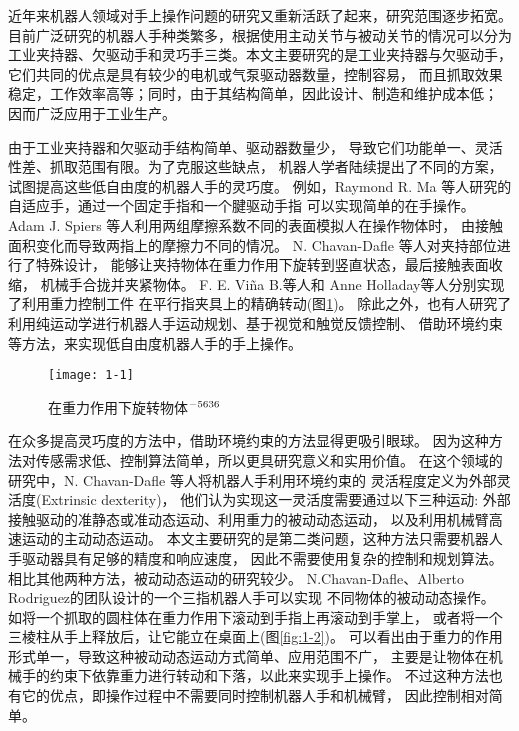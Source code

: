 近年来机器人领域对手上操作问题的研究又重新活跃了起来，研究范围逐步拓宽。
目前广泛研究的机器人手种类繁多，根据使用主动关节与被动关节的情况可以分为
工业夹持器、欠驱动手和灵巧手三类。本文主要研究的是工业夹持器与欠驱动手，
它们共同的优点是具有较少的电机或气泵驱动器数量，控制容易，
而且抓取效果稳定，工作效率高等；同时，由于其结构简单，因此设计、制造和维护成本低；
因而广泛应用于工业生产。

由于工业夹持器和欠驱动手结构简单、驱动器数量少，
导致它们功能单一、灵活性差、抓取范围有限。为了克服这些缺点，
机器人学者陆续提出了不同的方案，试图提高这些低自由度的机器人手的灵巧度。
例如，Raymond R. Ma 等人研究的自适应手，通过一个固定手指和一个腱驱动手指
可以实现简单的在手操作\cite{ref2}。
Adam J. Spiers 等人利用两组摩擦系数不同的表面模拟人在操作物体时，
由接触面积变化而导致两指上的摩擦力不同的情况\cite{ref3}。
N. Chavan-Dafle 等人对夹持部位进行了特殊设计，
能够让夹持物体在重力作用下旋转到竖直状态，最后接触表面收缩，
机械手合拢并夹紧物体\cite{ref4}。
F. E. Viña B.等人和 Anne Holladay等人分别实现了利用重力控制工件
在平行指夹具上的精确转动\cite{ref5,ref6}(图\ref{fig:1-1})。
除此之外，也有人研究了利用纯运动学进行机器人手运动规划、基于视觉和触觉反馈控制、
借助环境约束等方法，来实现低自由度机器人手的手上操作\cite{ref1}。

\begin{figure}[!ht]
  \centering
  \texttt{[image: 1-1]}
  \caption{在重力作用下旋转物体\cite{ref5}$^{-\rm 5636}$}
  \label{fig:1-1}
  \vspace{-0.3cm}
\end{figure}

在众多提高灵巧度的方法中，借助环境约束的方法显得更吸引眼球。
因为这种方法对传感需求低、控制算法简单，所以更具研究意义和实用价值。
在这个领域的研究中，N. Chavan-Dafle 等人将机器人手利用环境约束的
灵活程度定义为外部灵活度(Extrinsic dexterity)，
他们认为实现这一灵活度需要通过以下三种运动:
外部接触驱动的准静态或准动态运动、利用重力的被动动态运动，
以及利用机械臂高速运动的主动动态运动\cite{ref7}。
本文主要研究的是第二类问题，这种方法只需要机器人手驱动器具有足够的精度和响应速度，
因此不需要使用复杂的控制和规划算法。
相比其他两种方法，被动动态运动的研究较少。
N.Chavan-Dafle、Alberto Rodriguez的团队设计的一个三指机器人手可以实现
不同物体的被动动态操作。
如将一个抓取的圆柱体在重力作用下滚动到手指上再滚动到手掌上，
或者将一个三棱柱从手上释放后，让它能立在桌面上\cite{ref7}(图\ref{fig:1-2})。
可以看出由于重力的作用形式单一，导致这种被动动态运动方式简单、应用范围不广，
主要是让物体在机械手的约束下依靠重力进行转动和下落，以此来实现手上操作。
不过这种方法也有它的优点，即操作过程中不需要同时控制机器人手和机械臂，
因此控制相对简单。

